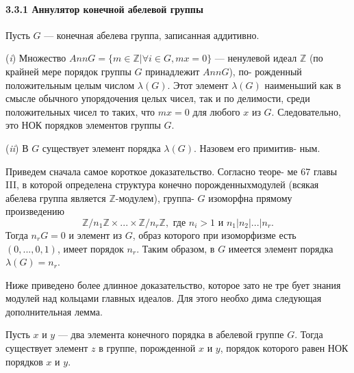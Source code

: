 \paragraph{3.3.1 Аннулятор конечной абелевой группы}
\begin{predl}
Пусть $G$ — конечная абелева группа, записанная аддитивно.
 
\par  (\textit{i}) Множество $AnnG = \{m \in \mathbb{Z} | \forall i \in G, mx = 0\}$ — ненулевой\linebreak
идеал $\mathbb{Z}$ (по крайней мере порядок группы $G$ принадлежит $Ann G$), по­-\linebreak
рожденный положительным целым числом $\lambda(G)$. Этот элемент $\lambda(G)$\linebreak
наименьший как в смысле обычного упорядочения целых чисел, так\linebreak
и по делимости, среди положительных чисел то таких, что $mx = 0$ для\linebreak
любого $x$ из $G$. Следовательно, это НОК порядков элементов группы $G$.
\par  (\textit{ii}) В $G$ существует элемент порядка $\lambda(G)$. Назовем его примитив­-\linebreak
ным.
 
\end{predl}
\begin{myproof}
Приведем сначала самое короткое доказательство. Согласно теоре­-\linebreak
ме 67 главы III, в которой определена структура конечно порожденных\linebreak модулей (всякая абелева группа является $\mathbb{Z}$-модулем), группа-\linebreak
$G$ изоморфна прямому произведению\\
$$\mathbb{Z}/n_1\mathbb{Z}\times...\times\mathbb{Z}/n_r\mathbb{Z}, \text { где } n_i > 1 \text{ и } n_1 | n_2 | ... | n_r.$$
Тогда $n_rG = 0$ и элемент из $G$, образ которого при изоморфизме\linebreak
есть $(0,...,0,1)$, имеет порядок $n_r$. Таким образом, в $G$ имеется\linebreak
элемент порядка $\lambda(G) = n_r$.
\end{myproof}
\newpage
Ниже приведено более длинное доказательство, которое зато не тре­
бует знания модулей над кольцами главных идеалов. Для этого необхо­
дима следующая дополнительная лемма.
\begin{lemma}
Пусть $x$ и $y$ — два элемента конечного порядка в абелевой группе\linebreak
$G$. Тогда существует элемент $z$ в группе, порожденной $x$ и $y$, порядок\linebreak
которого равен НОК порядков $x$ и $y$.
\end{lemma}
